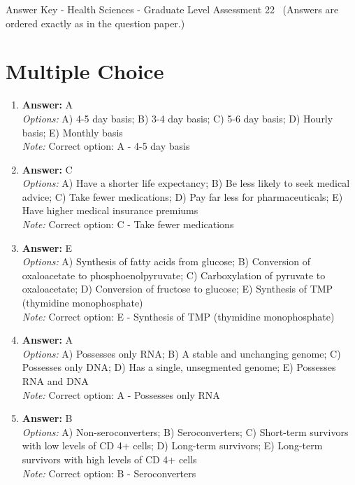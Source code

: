 \documentclass[12pt]{article}
\begin{document}
\begin{center}
Answer Key - Health Sciences - Graduate Level Assessment 22 \
\small (Answers are ordered exactly as in the question paper.)
\end{center}

\section*{Multiple Choice}
\begin{enumerate}[label=\arabic*.]
\item \textbf{Answer:} A
\\ \textit{Options:} A) 4-5 day basis; B) 3-4 day basis; C) 5-6 day basis; D) Hourly basis; E) Monthly basis
\\ \textit{Note:} Correct option: A - 4-5 day basis
\item \textbf{Answer:} C
\\ \textit{Options:} A) Have a shorter life expectancy; B) Be less likely to seek medical advice; C) Take fewer medications; D) Pay far less for pharmaceuticals; E) Have higher medical insurance premiums
\\ \textit{Note:} Correct option: C - Take fewer medications
\item \textbf{Answer:} E
\\ \textit{Options:} A) Synthesis of fatty acids from glucose; B) Conversion of oxaloacetate to phosphoenolpyruvate; C) Carboxylation of pyruvate to oxaloacetate; D) Conversion of fructose to glucose; E) Synthesis of TMP (thymidine monophosphate)
\\ \textit{Note:} Correct option: E - Synthesis of TMP (thymidine monophosphate)
\item \textbf{Answer:} A
\\ \textit{Options:} A) Possesses only RNA; B) A stable and unchanging genome; C) Possesses only DNA; D) Has a single, unsegmented genome; E) Possesses RNA and DNA
\\ \textit{Note:} Correct option: A - Possesses only RNA
\item \textbf{Answer:} B
\\ \textit{Options:} A) Non-seroconverters; B) Seroconverters; C) Short-term survivors with low levels of CD 4+ cells; D) Long-term survivors; E) Long-term survivors with high levels of CD 4+ cells
\\ \textit{Note:} Correct option: B - Seroconverters
\end{enumerate}
\end{document}
